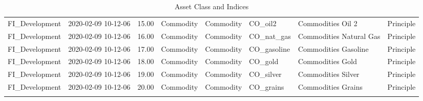 \begin{longtable}{llrlllll}
  FI\_Development & 2020-02-09 10-12-06 & 15.00 & Commodity & Commodity & CO\_oil2 & Commodities Oil 2 & Principle \\ 
  FI\_Development & 2020-02-09 10-12-06 & 16.00 & Commodity & Commodity & CO\_nat\_gas & Commodities Natural Gas & Principle \\ 
  FI\_Development & 2020-02-09 10-12-06 & 17.00 & Commodity & Commodity & CO\_gasoline & Commodities Gasoline & Principle \\ 
  FI\_Development & 2020-02-09 10-12-06 & 18.00 & Commodity & Commodity & CO\_gold & Commodities Gold & Principle \\ 
  FI\_Development & 2020-02-09 10-12-06 & 19.00 & Commodity & Commodity & CO\_silver & Commodities Silver & Principle \\ 
  FI\_Development & 2020-02-09 10-12-06 & 20.00 & Commodity & Commodity & CO\_grains & Commodities Grains & Principle \\ 
   \hline
\hline
\caption{Asset Class and Indices} 
\end{longtable}
